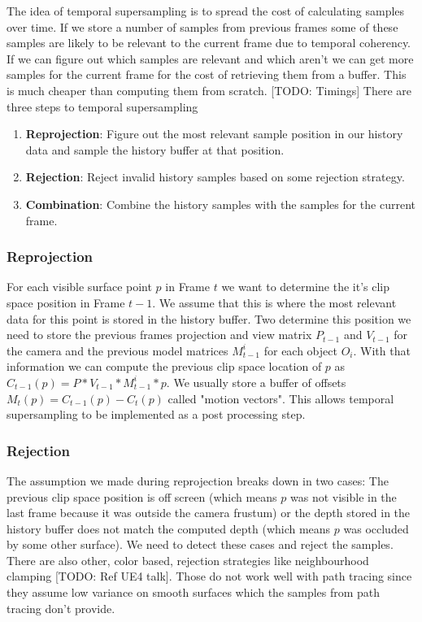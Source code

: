 \documentclass{ACGSeminar}
\begin{document}
The idea of temporal supersampling is to spread the cost of calculating samples over time. If we store a number of samples from previous frames some of these samples are likely to be relevant to the current frame due to temporal coherency. If we can figure out which samples are relevant and which aren't we can get more samples for the current frame for the cost of retrieving them from a buffer. This is much cheaper than computing them from scratch. [TODO: Timings]
There are three steps to temporal supersampling
\begin{enumerate}
\item \textbf{Reprojection}: Figure out the most relevant sample position in our history data and sample the history buffer at that position.
\item \textbf{Rejection}: Reject invalid history samples based on some rejection strategy.
\item \textbf{Combination}: Combine the history samples with the samples for the current frame.
\end{enumerate}

\subsubsection{Reprojection}
For each visible surface point $p$ in Frame $t$ we want to determine the it's clip space position in Frame $t-1$. We assume that this is where the most relevant data for this point is stored in the history buffer. Two determine this position we need to store the previous frames projection and view matrix $P_{t-1}$ and $V_{t-1}$ for the camera and the previous model matrices $M^{i}_{t-1}$ for each object $O_i$. 
With that information we can compute the previous clip space location of $p$ as $C_{t-1}(p) = P * V_{t-1} * M^{i}_{t-1} * p$. We usually store a buffer of offsets $M_t(p) = C_{t-1}(p) - C_{t}(p)$ called "motion vectors".
This allows temporal supersampling to be implemented as a post processing step.

\subsubsection{Rejection}
The assumption we made during reprojection breaks down in two cases: The previous clip space position is off screen (which means $p$ was not visible in the last frame because it was outside the camera frustum) or the depth stored in the history buffer does not match the computed depth (which means $p$ was occluded by some other surface). We need to detect these cases and reject the samples. There are also other, color based, rejection strategies like neighbourhood clamping [TODO: Ref UE4 talk]. Those do not work well with path tracing since they assume low variance on smooth surfaces which the samples from path tracing don't provide.
\end{document}
